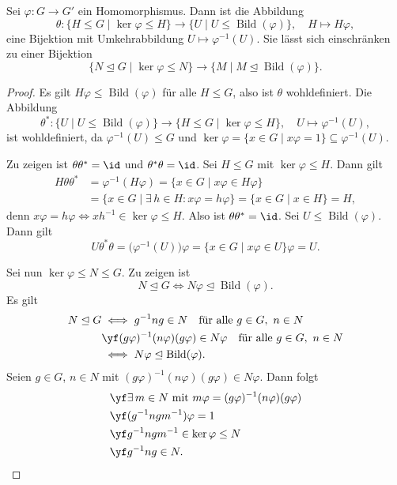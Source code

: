 \documentclass[11pt]{article}
\begin{document}
\begin{theorem}[Untergruppenkorrespondenz]\Theorem
  Sei $\varphi\colon G \to G'$ ein Homomorphismus. Dann ist die Abbildung
  \[ \theta\colon \{H \le G \mid \ker\varphi \le H\} \longrightarrow \{U \mid U \le \operatorname{Bild}(\varphi)\}, \quad H \longmapsto H\varphi, \]
  eine Bijektion mit Umkehrabbildung $U \mapsto \varphi^{-1}(U)$.
  Sie lässt sich einschränken zu einer Bijektion
  \[ \{N \trianglelefteq G \mid \ker\varphi \le N\} \longrightarrow \{M \mid M \trianglelefteq \operatorname{Bild}(\varphi)\}. \]
\end{theorem}
\begin{proof}
  Es gilt $H\varphi \le \operatorname{Bild}(\varphi)$ für alle $H \le G$, also ist $\theta$ wohldefiniert.
  Die Abbildung
  \[ \theta^*\colon \{U \mid U \le \operatorname{Bild}(\varphi)\} \longrightarrow \{H \le G \mid \ker\varphi \le H\}, \quad U \longmapsto \varphi^{-1}(U), \]
  ist wohldefiniert, da $\varphi^{-1}(U) \le G$ und $\ker\varphi = \{x \in G \mid x\varphi = 1\} \subseteq \varphi^{-1}(U)$.

  Zu zeigen ist $\theta\theta^* = \id$ und $\theta^*\theta = \id$.
  Sei $H \le G$ mit $\ker\varphi \le H$. Dann gilt
  \begin{align*}
    H\theta\theta^* &= \varphi^{-1}(H\varphi)
    = \{x \in G \mid x\varphi \in H\varphi\} \\
    &= \{x \in G \mid \exists\, h \in H \colon x\varphi = h\varphi\}
    = \{x \in G \mid x \in H\} = H,
  \end{align*}
  denn $x\varphi = h\varphi \iff xh^{-1} \in \ker\varphi \le H$.
  Also ist $\theta\theta^* = \id$.
Sei $U \le \operatorname{Bild}(\varphi)$. Dann gilt
  \[ U\theta^*\theta = \bigl(\varphi^{-1}(U)\bigr)\varphi = \{x \in G \mid x\varphi \in U\}\varphi = U. \]

  Sei nun $\ker\varphi \le N \le G$. Zu zeigen ist
  \[ N \trianglelefteq G \iff N\varphi \trianglelefteq \operatorname{Bild}(\varphi). \]
  Es gilt
  \begin{align*}
    N \trianglelefteq G &\iff g^{-1}ng \in N \quad \text{für alle } g \in G,\ n \in N \\
    &\yf (g\varphi)^{-1}(n\varphi)(g\varphi) \in N\varphi \quad \text{für alle } g \in G,\ n \in N \\
    &\iff N\varphi \trianglelefteq \operatorname{Bild}(\varphi).
  \end{align*}
  \Rueck Seien $g \in G$, $n \in N$ mit $(g\varphi)^{-1}(n\varphi)(g\varphi) \in N\varphi$. Dann folgt
  \begin{align*}
    &\yf \exists\, m \in N \text{ mit } m\varphi = (g\varphi)^{-1}(n\varphi)(g\varphi) \\
    &\yf (g^{-1}ngm^{-1})\varphi = 1 \\
    &\yf g^{-1}ngm^{-1} \in \ker\varphi \le N \\
    &\yf g^{-1}ng \in N. \qedhere
  \end{align*}
\end{proof}
\end{document}
